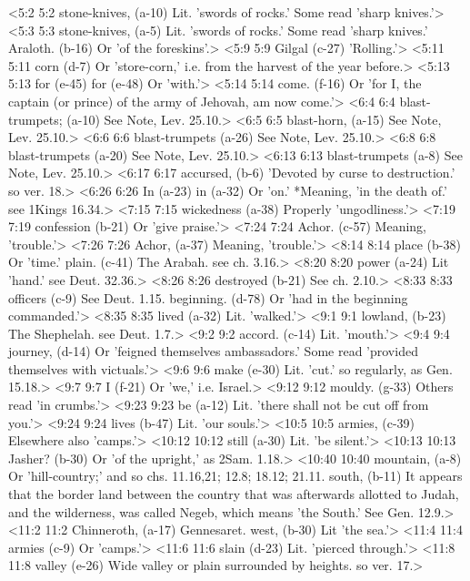 <5:2 5:2  stone-knives, (a-10) Lit. 'swords of rocks.' Some read 'sharp knives.'>
<5:3 5:3  stone-knives, (a-5)  Lit. 'swords of rocks.' Some read 'sharp knives.'
  Araloth. (b-16)  Or 'of the foreskins'.>
<5:9 5:9  Gilgal (c-27)  'Rolling.'>
<5:11 5:11  corn (d-7)  Or 'store-corn,' i.e. from the harvest of the year before.>
<5:13 5:13  for (e-45)  for (e-48)
  Or 'with.'>
<5:14 5:14  come. (f-16)  Or 'for I, the captain (or prince) of the army of Jehovah, am  now come.'>
<6:4 6:4  blast-trumpets; (a-10) See Note, Lev. 25.10.>
<6:5 6:5  blast-horn, (a-15) See Note, Lev. 25.10.>
<6:6 6:6  blast-trumpets (a-26) See Note, Lev. 25.10.>
<6:8 6:8  blast-trumpets (a-20) See Note, Lev. 25.10.>
<6:13 6:13  blast-trumpets (a-8)  See Note, Lev. 25.10.>
<6:17 6:17  accursed, (b-6)  'Devoted by curse to destruction.' so ver. 18.>
<6:26 6:26  In (a-23)  in (a-32)
  Or 'on.' *Meaning, 'in the death of.' see 1Kings 16.34.>
<7:15 7:15  wickedness (a-38)  Properly 'ungodliness.'>
<7:19 7:19  confession (b-21)  Or 'give praise.'>
<7:24 7:24  Achor. (c-57)  Meaning, 'trouble.'>
<7:26 7:26  Achor, (a-37)  Meaning, 'trouble.'>
<8:14 8:14  place (b-38)  Or 'time.'
  plain. (c-41)  The Arabah. see ch. 3.16.>
<8:20 8:20  power (a-24)  Lit 'hand.' see Deut. 32.36.>
<8:26 8:26  destroyed (b-21)  See ch. 2.10.>
<8:33 8:33  officers (c-9)  See Deut. 1.15.
  beginning. (d-78)  Or 'had in the beginning commanded.'>
<8:35 8:35  lived (a-32)  Lit. 'walked.'>
<9:1 9:1  lowland, (b-23)  The Shephelah. see Deut. 1.7.>
<9:2 9:2  accord. (c-14)  Lit. 'mouth.'>
<9:4 9:4  journey, (d-14)  Or 'feigned themselves ambassadors.' Some read 'provided  themselves with victuals.'>
<9:6 9:6  make (e-30)  Lit. 'cut.' so regularly, as Gen. 15.18.>
<9:7 9:7  I (f-21)  Or 'we,' i.e. Israel.>
<9:12 9:12  mouldy. (g-33)  Others read 'in crumbs.'>
<9:23 9:23  be (a-12)  Lit. 'there shall not be cut off from you.'>
<9:24 9:24  lives (b-47)  Lit. 'our souls.'>
<10:5 10:5  armies, (c-39)  Elsewhere also 'camps.'>
<10:12 10:12  still (a-30)  Lit. 'be silent.'>
<10:13 10:13  Jasher? (b-30)  Or 'of the upright,' as 2Sam. 1.18.>
<10:40 10:40  mountain, (a-8)  Or 'hill-country;' and so chs. 11.16,21; 12.8; 18.12; 21.11.
  south, (b-11)  It appears that the border land between the country that was  afterwards allotted to Judah, and the wilderness, was called  Negeb, which means 'the South.' See Gen. 12.9.>
<11:2 11:2  Chinneroth, (a-17)  Gennesaret.
  west, (b-30)  Lit 'the sea.'>
<11:4 11:4  armies (c-9)  Or 'camps.'>
<11:6 11:6  slain (d-23)  Lit. 'pierced through.'>
<11:8 11:8  valley (e-26)  Wide valley or plain surrounded by heights. so ver. 17.>
